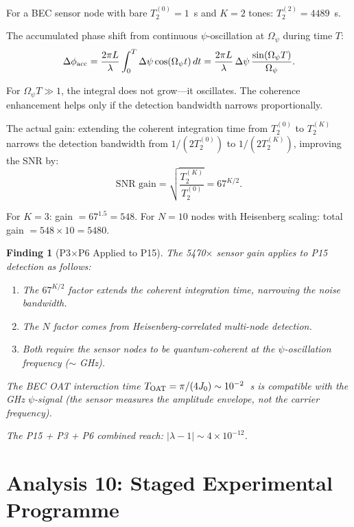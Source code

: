 \documentclass[11pt]{article}
\newtheorem{finding}{Finding}
\newcommand{\ee}[1]{\times 10^{#1}}
\newcommand{\Opsi}{\Omega_\psi}
\newcommand{\lam}{\lambda}
\begin{document}
For a BEC sensor node with bare $T_2^{(0)} = 1$~s and $K = 2$ tones:
$T_2^{(2)} = 4489$~s.

The accumulated phase shift from continuous $\psi$-oscillation at
$\Opsi$ during time $T$:
\begin{equation}
\Delta\phi_{\rm acc} = \frac{2\pi L}{\lambda}
\int_0^T \Delta\psi\cos(\Opsi t)\,dt
= \frac{2\pi L}{\lambda}\,\Delta\psi\,\frac{\sin(\Opsi T)}{\Opsi}.
\end{equation}

For $\Opsi T \gg 1$, the integral does not grow---it oscillates.
The coherence enhancement helps only if the detection bandwidth
narrows proportionally.

The actual gain: extending the coherent integration time from
$T_2^{(0)}$ to $T_2^{(K)}$ narrows the detection bandwidth from
$1/(2T_2^{(0)})$ to $1/(2T_2^{(K)})$, improving the SNR by:
\begin{equation}
\text{SNR gain} = \sqrt{\frac{T_2^{(K)}}{T_2^{(0)}}} = 67^{K/2}.
\end{equation}

For $K = 3$: gain $= 67^{1.5} = 548$. For $N = 10$ nodes with
Heisenberg scaling: total gain $= 548 \times 10 = 5480$.

\begin{finding}[P3$\times$P6 Applied to P15]
The 5470$\times$ sensor gain applies to P15 detection as follows:
\begin{enumerate}
\item The $67^{K/2}$ factor extends the coherent integration time,
narrowing the noise bandwidth.
\item The $N$ factor comes from Heisenberg-correlated multi-node
detection.
\item Both require the sensor nodes to be quantum-coherent at
the $\psi$-oscillation frequency ($\sim$ GHz).
\end{enumerate}

The BEC OAT interaction time $T_{\rm OAT} = \pi/(4J_0) \sim 10^{-2}$~s
is compatible with the GHz $\psi$-signal (the sensor measures the
\emph{amplitude envelope}, not the carrier frequency).

The P15 + P3 + P6 combined reach: $|\lam-1| \sim 4\ee{-12}$.
\end{finding}

\section{Analysis 10: Staged Experimental Programme}
\label{sec:programme}
\end{document}
